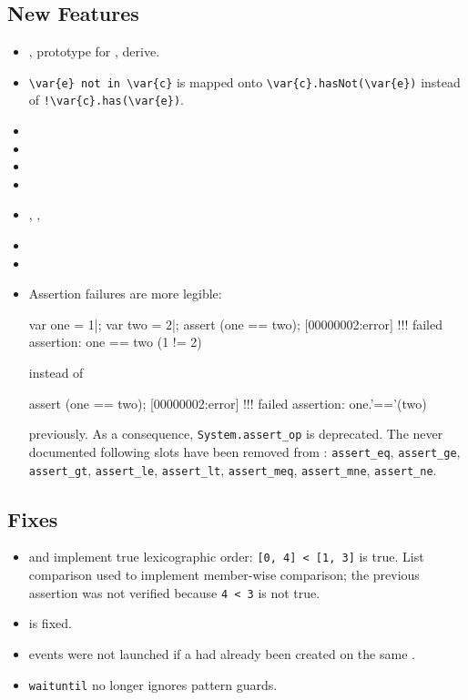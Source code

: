 \subsection{New Features}
\begin{itemize}
\item {}, prototype for ,
   derive.
\item \lstinline|\var{e} not in \var{c}| is mapped onto
  \lstinline|\var{c}.hasNot(\var{e})| instead of
  \lstinline|!\var{c}.has(\var{e})|.
\item {}
\item {}
\item {}
\item {}
\item {}, , 
\item {}
\item {}
\item Assertion failures are more legible:

\begin{urbiscript}
var one = 1|;
var two = 2|;
assert (one == two);
[00000002:error] !!! failed assertion: one == two (1 != 2)
\end{urbiscript}

  \noindent
  instead of

\begin{urbiunchecked}
assert (one == two);
[00000002:error] !!! failed assertion: one.'=='(two)
\end{urbiunchecked}
  \noindent
  previously.  As a consequence, \lstinline{System.assert_op} is deprecated.
  The never documented following slots have been removed from
  : \lstinline{assert_eq}, \lstinline{assert_ge},
  \lstinline{assert_gt}, \lstinline{assert_le}, \lstinline{assert_lt},
  \lstinline{assert_meq}, \lstinline{assert_mne}, \lstinline{assert_ne}.
\end{itemize}

\subsection{Fixes}
\begin{itemize}
\item {} and  implement true
  lexicographic order: \lstinline|[0, 4] < [1, 3]| is true.  List comparison
  used to implement member-wise comparison; the previous assertion was not
  verified because \lstinline|4 < 3| is not true.
\item {} is fixed.
\item {} events were not launched if a
   had already been created on the same
  .
\item \lstinline"waituntil" no longer ignores pattern guards.
\end{itemize}

